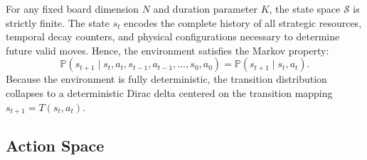 \documentclass{article}
\begin{document}
For any fixed board dimension $N$ and duration parameter $K$, the state space $\mathcal{S}$ is strictly finite. The state $s_t$ encodes the complete history of all strategic resources, temporal decay counters, and physical configurations necessary to determine future valid moves. Hence, the environment satisfies the Markov property:
\begin{equation}
\mathbb{P}(s_{t+1} \mid s_t, a_t, s_{t-1}, a_{t-1}, \dots, s_0, a_0) = \mathbb{P}(s_{t+1} \mid s_t, a_t).
\end{equation}
Because the environment is fully deterministic, the transition distribution collapses to a deterministic Dirac delta centered on the transition mapping $s_{t+1} = T(s_t, a_t)$.

\subsection{Action Space}
\label{subsec:action_space}
\end{document}

